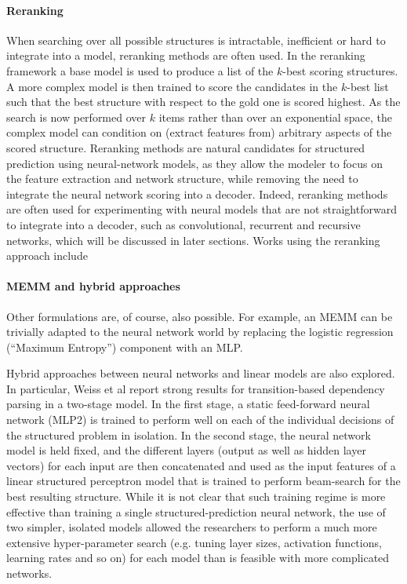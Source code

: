 \documentclass[jair,twoside,11pt,theapa]{article}
\newcommand{\ygcomment}[1]{\textbf{[TODO: #1]}}
\renewcommand{\ygcomment}[1]{}
\begin{document}
{\paragraph{Reranking} When searching over all possible structures is
intractable, inefficient or hard to integrate into a model, reranking methods
are often used. In the reranking framework \cite{charniak2005coarsetofine,collins2005discriminative}
a base model is used to produce a list of the $k$-best scoring structures.
A more complex model is then trained to score the candidates in the $k$-best
list such that the best structure with respect to the gold one is scored
highest.  As the search is now performed over $k$ items rather than over an
exponential space, the complex model can condition on
(extract features from) arbitrary aspects of the scored structure.
Reranking methods are natural candidates for structured prediction using
neural-network models, as they allow the modeler to focus on the feature
extraction and network structure, while removing the need to integrate the
neural network scoring into a decoder.  Indeed, reranking methods are often used
for experimenting with neural models that are not straightforward to integrate
into a decoder, such as convolutional, recurrent and recursive networks, which
will be discussed in later sections. Works using the reranking approach include 
\cite{socher2013parsing,auli2013joint,le2014insideoutside,zhu2015reranking}

\paragraph{MEMM and hybrid approaches}\ygcomment{elaborate on MEMM?}
Other formulations are, of course, also possible. For example, an MEMM
\cite{mccallum2000maximum} can be
trivially adapted to the neural network world by replacing the logistic
regression (``Maximum Entropy'') component with an MLP.

Hybrid approaches between neural networks and linear models are also explored.
In particular, Weiss et al \cite{weiss2015structured} report strong results for
transition-based dependency parsing in a two-stage model.  In the first stage, 
a static feed-forward neural
network (MLP2) is trained to perform well on 
each of the individual decisions of the structured problem in isolation.
In the second stage, the neural network model is held fixed, and the
different layers (output as well as hidden layer vectors) for each input are
then concatenated and used as the input features of a linear structured
perceptron model \cite{collins2002discriminative} that is trained to perform
beam-search for the best resulting
structure. While it is not clear that such training regime is more effective than
training a single structured-prediction neural network, the use of two simpler,
isolated models allowed the researchers to perform a much more extensive hyper-parameter
search (e.g. tuning layer sizes, activation functions, learning rates and so on)
for each model than is feasible with more complicated networks.


}
\end{document}
